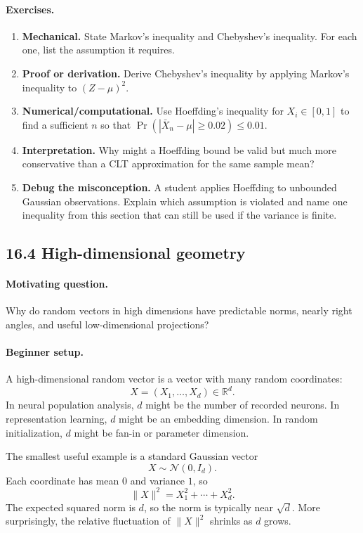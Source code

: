 \paragraph{Exercises.}
\begin{enumerate}[label=\textbf{16.3.\arabic*.}, leftmargin=*]
\item \textbf{Mechanical.} State Markov's inequality and Chebyshev's inequality. For each one, list the assumption it requires.
\item \textbf{Proof or derivation.} Derive Chebyshev's inequality by applying Markov's inequality to \((Z-\mu)^2\).
\item \textbf{Numerical/computational.} Use Hoeffding's inequality for \(X_i\in[0,1]\) to find a sufficient \(n\) so that \(\Pr(|\bar X_n-\mu|\geq0.02)\leq0.01\).
\item \textbf{Interpretation.} Why might a Hoeffding bound be valid but much more conservative than a CLT approximation for the same sample mean?
\item \textbf{Debug the misconception.} A student applies Hoeffding to unbounded Gaussian observations. Explain which assumption is violated and name one inequality from this section that can still be used if the variance is finite.
\end{enumerate}

\subsection{16.4 High-dimensional geometry}

\paragraph{Motivating question.}
Why do random vectors in high dimensions have predictable norms, nearly right angles, and useful low-dimensional projections?

\paragraph{Beginner setup.}
A high-dimensional random vector is a vector with many random coordinates:
\[
X=(X_1,\ldots,X_d)\in\mathbb R^d.
\]
In neural population analysis, \(d\) might be the number of recorded neurons. In representation learning, \(d\) might be an embedding dimension. In random initialization, \(d\) might be fan-in or parameter dimension.

The smallest useful example is a standard Gaussian vector
\[
X\sim\mathcal N(0,I_d).
\]
Each coordinate has mean \(0\) and variance \(1\), so
\[
\|X\|^2=X_1^2+\cdots+X_d^2.
\]
The expected squared norm is \(d\), so the norm is typically near \(\sqrt d\). More surprisingly, the relative fluctuation of \(\|X\|^2\) shrinks as \(d\) grows.

